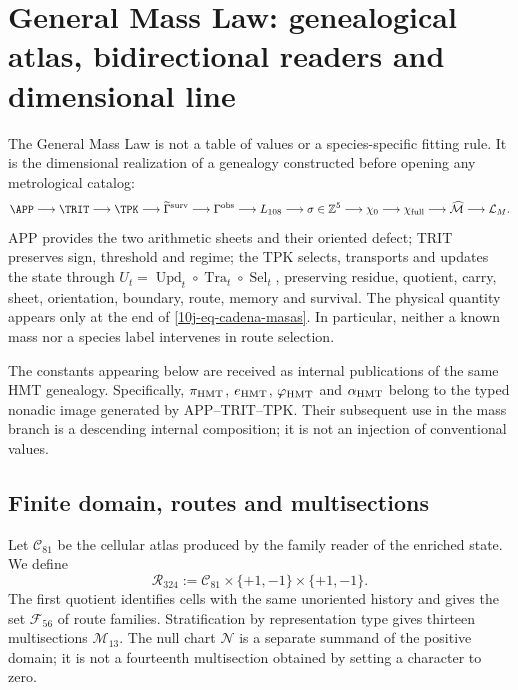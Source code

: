 \section{General Mass Law: genealogical atlas, bidirectional readers and dimensional line}
\label{10j-sec-ley-general-masas}

The General Mass Law is not a table of values or a species-specific fitting
rule. It is the dimensional realization of a genealogy constructed before
opening any metrological catalog:
\begin{equation}
 \APP\longrightarrow\TRIT\longrightarrow\TPK
 \longrightarrow\widetilde\Gamma^{\rm surv}
 \longrightarrow\Gamma^{\rm obs}
 \longrightarrow L_{108}
 \longrightarrow\sigma\in\mathbb Z^5
 \longrightarrow\chi_0
 \longrightarrow\chi_{\rm full}
 \longrightarrow\widehat{\mathcal M}
 \longrightarrow\mathcal L_M .
 \label{10j-eq-cadena-masas}
\end{equation}
APP provides the two arithmetic sheets and their oriented defect; TRIT preserves
sign, threshold and regime; the TPK selects, transports and updates the state
through
\(
 U_t=\operatorname{Upd}_t\circ\operatorname{Tra}_t\circ
 \operatorname{Sel}_t
\), preserving residue, quotient, carry, sheet, orientation, boundary,
route, memory and survival. The physical quantity appears only at the end
of \eqref{10j-eq-cadena-masas}. In particular, neither a known mass nor a
species label intervenes in route selection.

The constants appearing below are received as internal publications of
the same HMT genealogy. Specifically, \(\pi_{\rm HMT}\), \(e_{\rm HMT}\),
\(\varphi_{\rm HMT}\) and \(\alpha_{\rm HMT}\) belong to the typed nonadic
image generated by APP--TRIT--TPK. Their subsequent use in the mass branch is a
descending internal composition; it is not an injection of conventional
values.

\subsection{Finite domain, routes and multisections}

\begin{definition}
\label{10j-def-atlas}
Let \(\mathcal C_{81}\) be the cellular atlas produced by the family reader
of the enriched state. We define
\begin{equation}
 \mathcal R_{324}:=
 \mathcal C_{81}\times\{+1,-1\}\times\{+1,-1\}.
 \label{10j-eq-rutas-324}
\end{equation}
The first quotient identifies cells with the same unoriented history and gives
the set \(\mathcal F_{56}\) of route families. Stratification by
representation type gives thirteen multisections
\(\mathcal M_{13}\). The null chart \(\mathcal N\) is a separate summand of the
positive domain; it is not a fourteenth multisection obtained by setting
a character to zero.
\end{definition}

